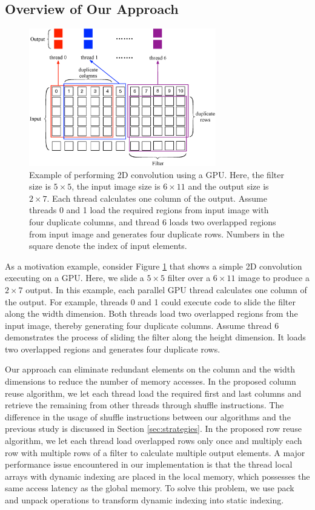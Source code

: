 \subsection{Overview of Our Approach}
\begin{figure}[t!]
\centering
  \includegraphics[width=\columnwidth,height=6cm]{./figure/twostrategies.eps}
  \caption{Example of performing 2D convolution using a GPU. Here, the filter size is $5 \times 5$, the input image size is $6 \times 11$
  and the output size is $2 \times 7$. Each thread calculates one column of the output. Assume threads 0 and 1 load the required regions from input
  image with four duplicate columns, and thread 6 loads two overlapped regions from input image and generates four duplicate rows. Numbers in
  the square denote the index of input elements.}
  \label{fig:twostrategies}
\end{figure}
As a motivation example, consider Figure \ref{fig:twostrategies} that shows a simple 2D convolution executing on a GPU. Here, we slide a $5
\times 5$ filter over a $6 \times 11$ image to produce a $2 \times 7$ output. In this example, each parallel GPU thread calculates one
column of the output. For example, threads 0 and 1 could execute code to slide the filter along the width dimension. Both threads load two
overlapped regions from the input image, thereby generating four duplicate columns. Assume thread 6 demonstrates the process of sliding the
filter along the height dimension. It loads two overlapped regions and generates four duplicate rows.

Our approach can eliminate redundant elements on the column and the width dimensions to reduce the number of memory accesses.  In the
proposed column reuse algorithm, we let each thread load the required first and last columns and retrieve the remaining from other threads
through shuffle instructions. The difference in the usage of shuffle instructions between our algorithms and the previous study
\cite{vasilache2014fast} is discussed in Section \ref{sec:strategies}. In the proposed row reuse algorithm, we let each thread load
overlapped rows only once and multiply each row with multiple rows of a filter to calculate multiple output elements. A major performance
issue encountered in our implementation is that the thread local arrays with dynamic indexing are placed in the local memory, which
possesses the same access latency as the global memory. To solve this problem, we use pack and unpack operations to transform dynamic
indexing into static indexing.
